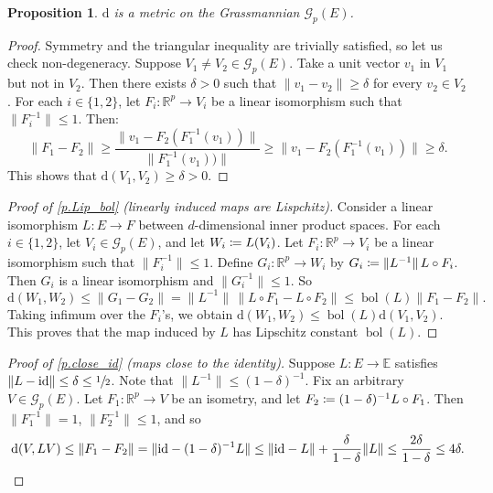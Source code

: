 \documentclass[JEP,XML,SOM,Unicode]{cedram}
\let\mathcal\mathscr
\def\vcentcolon{\mathrel{\mathop\ordinarycolon}}
\providecommand\ordinarycolon{:}
\providecommand*\coloneqq{\vcentcolon\mathrel{\mkern-1.2mu}=}
\theoremstyle{plain}
\newtheorem{proposition}[theorem]{Proposition}
\theoremstyle{definition}
\newcommand{\RR}{\mathbb{R}}
\newcommand{\EE}{\mathbb{E}}
\newcommand{\id}{\mathrm{id}}
\newcommand{\dd}{\mathrm{d}}
\DeclareMathOperator{\bol}{bol}
\newcommand{\Gr}{\mathcal{G}}
\begin{document}
\begin{proposition}\label{p.metric}
$\dd$ is a metric on the Grassmannian $\Gr_p(E)$.
\end{proposition}

\begin{proof}
Symmetry and the triangular inequality are trivially satisfied, so let us check non-degeneracy.
Suppose $V_1 \neq V_2 \in \Gr_p(E)$.
Take a unit vector $v_1$ in $V_1$ but not in $V_2$.
Then there exists $\delta>0$ such that $\|v_1-v_2\| \ge \delta$ for every $v_2 \in V_2$.
For each $i \in \{1,2\}$, let $F_i \colon \RR^p \to V_i$ be a linear isomorphism such that $\|F_i^{-1}\| \le 1$.
Then:
\[
\|F_1 - F_2\| \ge \frac{\|v_1 - F_2(F_1^{-1}(v_1))\|}{\|F_1^{-1}(v_1))\|} \ge \|v_1 - F_2(F_1^{-1}(v_1))\| \ge \delta.
\]
This shows that $\dd(V_1,V_2) \ge \delta > 0$.
\end{proof}

\begin{proof}[Proof of \cref{p.Lip_bol} (linearly induced maps are Lispchitz)]
Consider a linear isomorphism $L \colon E \to F$ between $d$-dimensional inner product spaces.
For each $i \in \{1,2\}$, let $V_i \in \Gr_p(E)$, and let $W_i \coloneqq L(V_i)$.
Let $F_i \colon \RR^p \to V_i$ be a linear isomorphism such that $\|F_i^{-1}\| \le 1$.
Define $G_i \colon \RR^p \to W_i$ by $G_i \coloneqq \|L^{-1}\| \, L \circ F_i$.
Then $G_i$ is a linear isomorphism and $\|G_i^{-1}\| \le 1$.
So
\[
\dd(W_1,W_2) \le \| G_1 - G_2 \| = \|L^{-1}\| \, \|L \circ F_1 - L \circ F_2 \| \le \bol(L) \| F_1 - F_2 \|.
\]
Taking infimum over the $F_i$'s, we obtain $\dd(W_1,W_2) \le \bol(L) \dd(V_1,V_2)$.
This proves that the map induced by $L$ has Lipschitz constant $\bol(L)$.
\end{proof}

\begin{proof}[Proof of \cref{p.close_id} (maps close to the identity)]
Suppose $L \colon E \to \EE$ satisfies $\|L - \id \|\le \delta \le \sfrac{1}{2}$.
Note that $\|L^{-1}\| \le (1-\delta)^{-1}$.
Fix an arbitrary $V \in \Gr_p(E)$. Let $F_1 \colon \RR^p \to V$ be an isometry, and let $F_2 \coloneqq (1-\delta)^{-1} L \circ F_1$.
Then $\|F_1^{-1}\|=1$, $\|F_2^{-1}\| \le 1$, and so
\begin{equation*}
\dd(V, LV) \le \|F_1 - F_2\| = \| \id - (1-\delta)^{-1} L\| \le \| \id - L\| + \frac{\delta}{1-\delta} \|L\| \le \frac{2\delta}{1-\delta} \le 4 \delta.
\qedhere
\end{equation*}
\end{proof}
\end{document}
